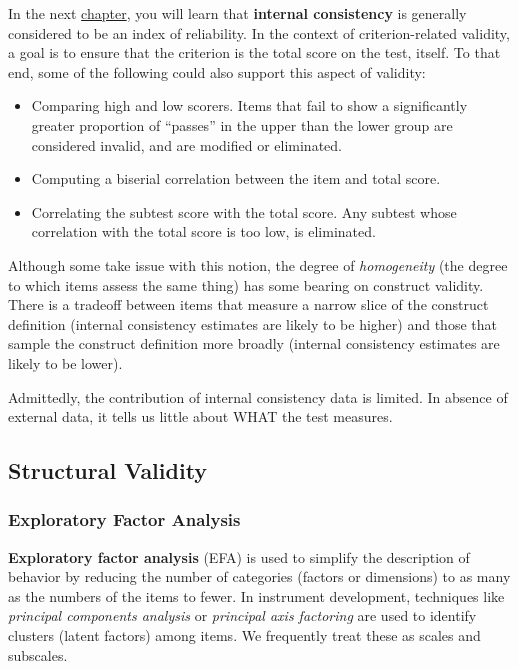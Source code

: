 \documentclass[
  english,
]{book}
\providecommand{\tightlist}{%
  \setlength{\itemsep}{0pt}\setlength{\parskip}{0pt}}
\begin{document}
In the next \protect\hyperlink{rxx}{chapter}, you will learn that \textbf{internal consistency} is generally considered to be an index of reliability. In the context of criterion-related validity, a goal is to ensure that the criterion is the total score on the test, itself. To that end, some of the following could also support this aspect of validity:

\begin{itemize}
\tightlist
\item
  Comparing high and low scorers. Items that fail to show a significantly greater proportion of ``passes'' in the upper than the lower group are considered invalid, and are modified or eliminated.
\item
  Computing a biserial correlation between the item and total score.\\
\item
  Correlating the subtest score with the total score. Any subtest whose correlation with the total score is too low, is eliminated.
\end{itemize}

Although some take issue with this notion, the degree of \emph{homogeneity} (the degree to which items assess the same thing) has some bearing on construct validity. There is a tradeoff between items that measure a narrow slice of the construct definition (internal consistency estimates are likely to be higher) and those that sample the construct definition more broadly (internal consistency estimates are likely to be lower).

Admittedly, the contribution of internal consistency data is limited. In absence of external data, it tells us little about WHAT the test measures.

\hypertarget{structural-validity}{%
\subsection{Structural Validity}\label{structural-validity}}

\hypertarget{exploratory-factor-analysis}{%
\subsubsection{Exploratory Factor Analysis}\label{exploratory-factor-analysis}}

\textbf{Exploratory factor analysis} (EFA) is used to simplify the description of behavior by reducing the number of categories (factors or dimensions) to as many as the numbers of the items to fewer. In instrument development, techniques like \emph{principal components analysis} or \emph{principal axis factoring} are used to identify clusters (latent factors) among items. We frequently treat these as scales and subscales.
\end{document}
